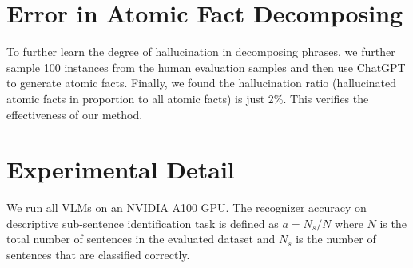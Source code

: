 \section{Error in Atomic Fact Decomposing}
\label{app:decompose}
{To further learn the degree of hallucination in decomposing phrases, we further sample 100 instances from the human evaluation samples and then use ChatGPT to generate atomic facts. Finally, we found the hallucination ratio (hallucinated atomic facts in proportion to all atomic facts) is just 2\%. This verifies the effectiveness of our method.}


\section{Experimental Detail}
We run all VLMs on an NVIDIA A100 GPU. 
{The recognizer accuracy on descriptive
sub-sentence identification task is defined as $a=N_s/N$ where $N$
 is the total number of sentences in the evaluated dataset and $N_s$
 is the number of sentences that are classified correctly.}


\begin{table}[]
    \centering \small
    \caption{Correlation between our ablation methods and human judgment on LVLM hallucinations, measured by Pearson's $r$, Spearman’s $\rho$, and Kendall’s $\tau$.
    }
    \label{tab:ablation1}
\end{table}


